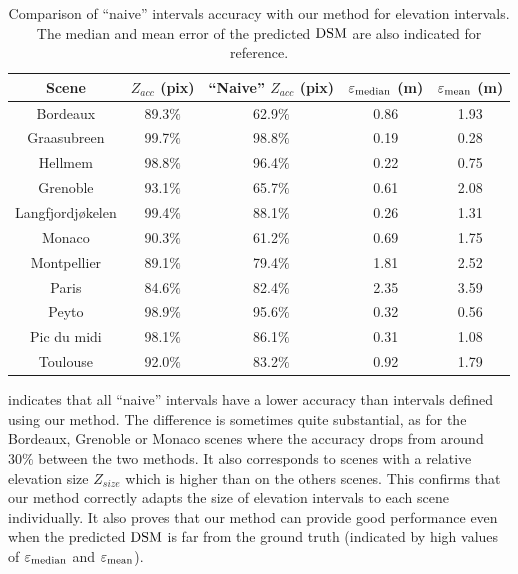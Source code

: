 \begin{table}[ht]
    \centering
    \begin{tabular}{|c||c|c|c|c|}
        \hline
        Scene & $Z_{acc}$ (pix) & ``Naive'' $Z_{acc}$ (pix) & $\varepsilon_{\operatorname*{median}}$ (m) & $\varepsilon_{\operatorname*{mean}}$ (m)
        \\\hline\hline
        Bordeaux & 89.3$\%$ & 62.9$\%$ & 0.86 & 1.93\\\hline
        Graasubreen & 99.7$\%$ & 98.8$\%$ & 0.19 & 0.28\\\hline
        Hellmem & 98.8$\%$ & 96.4$\%$ & 0.22 & 0.75\\\hline
        Grenoble & 93.1$\%$ & 65.7$\%$ & 0.61 & 2.08\\\hline
        Langfjordjøkelen & 99.4$\%$ & 88.1$\%$ & 0.26 & 1.31\\\hline
        Monaco & 90.3$\%$ & 61.2$\%$ & 0.69 & 1.75\\\hline
        Montpellier & 89.1$\%$ & 79.4$\%$ & 1.81 & 2.52\\\hline
        Paris & 84.6$\%$ & 82.4$\%$ & 2.35 & 3.59\\\hline
        Peyto & 98.9$\%$ & 95.6$\%$ & 0.32 & 0.56\\\hline
        Pic du midi & 98.1$\%$ & 86.1$\%$ & 0.31 & 1.08\\\hline
        Toulouse & 92.0$\%$ & 83.2$\%$ & 0.92 & 1.79\\\hline
    \end{tabular}
    \caption{Comparison of ``naive'' intervals accuracy with our method for elevation intervals. The median and mean error of the predicted $\mathrm{DSM}$ are also indicated for reference.}
    \label{tab:naive_accuracy}
\end{table}
 indicates that all ``naive'' intervals have a lower accuracy than intervals defined using our method. The difference is sometimes quite substantial, as for the Bordeaux, Grenoble or Monaco scenes where the accuracy drops from around $30\%$ between the two methods. It also corresponds to scenes with a relative elevation size $Z_{size}$ which is higher than on the others scenes. This confirms that our method correctly adapts the size of elevation intervals to each scene individually. It also proves that our method can provide good performance even when the predicted $\mathrm{DSM}$ is far from the ground truth (indicated by high values of $\varepsilon_{\operatorname*{median}}$ and $\varepsilon_{\operatorname*{mean}}$). 

